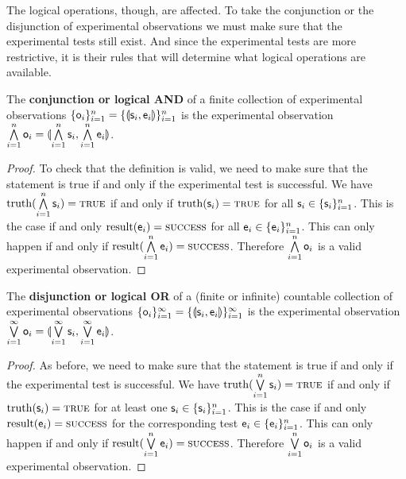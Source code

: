 \documentclass[11pt,letterpaper,fleqn]{memoir} %
\begin{document}
The logical operations, though, are affected. To take the conjunction or the disjunction of experimental observations we must make sure that the experimental tests still exist. And since the experimental tests are more restrictive, it is their rules that will determine what logical operations are available.
\begin{mathSection}
	\begin{defn}
	The \textbf{conjunction or logical AND} of a finite collection  of experimental observations $\{\mathsf{o}_i\}_{i=1}^{n}=\{\llparenthesis \mathsf{s}_i, \mathsf{e}_i\rrparenthesis\}_{i=1}^{n}$ is the experimental observation $\bigwedge\limits_{i=1}^{n} \mathsf{o}_i = \llparenthesis \bigwedge\limits_{i=1}^{n} \mathsf{s}_i, \bigwedge\limits_{i=1}^{n} \mathsf{e}_i\rrparenthesis$.
\end{defn}
\begin{proof}
	To check that the definition is valid, we need to make sure that the statement is true if and only if the experimental test is successful. We have $\operatorname{truth}(\bigwedge\limits_{i=1}^{n} \mathsf{s}_i) = \textsc{true}$ if and only if $\operatorname{truth}(\mathsf{s}_i) = \textsc{true}$ for all $\mathsf{s}_i \in \{\mathsf{s}_i\}_{i=1}^{n}$. This is the case if and only $\operatorname{result}(\mathsf{e}_i) = \textsc{success}$ for all $\mathsf{e}_i \in \{\mathsf{e}_i\}_{i=1}^{n}$. This can only happen if and only if   $\operatorname{result}(\bigwedge\limits_{i=1}^{n} \mathsf{e}_i) = \textsc{success}$. Therefore $\bigwedge\limits_{i=1}^{n} \mathsf{o}_i$ is a valid experimental observation.
\end{proof}
	\begin{defn}
	The \textbf{disjunction or logical OR} of a (finite or infinite) countable  collection of experimental observations $\{\mathsf{o}_i\}_{i=1}^{\infty}=\{\llparenthesis \mathsf{s}_i, \mathsf{e}_i\rrparenthesis\}_{i=1}^{\infty}$ is the experimental observation $\bigvee\limits_{i=1}^{\infty} \mathsf{o}_i = \llparenthesis \bigvee\limits_{i=1}^{\infty} \mathsf{s}_i, \bigvee\limits_{i=1}^{\infty} \mathsf{e}_i\rrparenthesis$.
\end{defn}
\begin{proof}
	As before, we need to make sure that the statement is true if and only if the experimental test is successful. We have $\operatorname{truth}(\bigvee\limits_{i=1}^{n} \mathsf{s}_i) = \textsc{true}$ if and only if $\operatorname{truth}(\mathsf{s}_i) = \textsc{true}$ for at least one $\mathsf{s}_i \in \{\mathsf{s}_i\}_{i=1}^{n}$. This is the case if and only $\operatorname{result}(\mathsf{e}_i) = \textsc{success}$ for the corresponding test $\mathsf{e}_i \in \{\mathsf{e}_i\}_{i=1}^{n}$. This can only happen if and only if   $\operatorname{result}(\bigvee\limits_{i=1}^{n} \mathsf{e}_i) = \textsc{success}$. Therefore $\bigvee\limits_{i=1}^{n} \mathsf{o}_i$ is a valid experimental observation.
\end{proof}
\end{mathSection}
\end{document}
